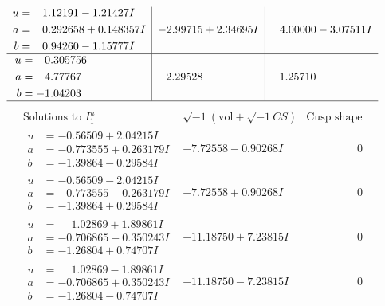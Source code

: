 \documentclass[1p]{elsarticle_modified}
\theoremstyle{definition}
\newcommand{\I}{\sqrt{-1}}
\begin{document}
$$\begin{array}{c|c|c}
\begin{aligned}
u &= \phantom{-}1.12191 - 1.21427 I \\
a &= \phantom{-}0.292658 + 0.148357 I \\
b &= \phantom{-}0.94260 - 1.15777 I\end{aligned}
 & -2.99715 + 2.34695 I & \phantom{-}4.00000 - 3.07511 I \\ \hline\begin{aligned}
u &= \phantom{-}0.305756\phantom{ +0.000000I} \\
a &= \phantom{-}4.77767\phantom{ +0.000000I} \\
b &= -1.04203\phantom{ +0.000000I}\end{aligned}
 & \phantom{-}2.29528\phantom{ +0.000000I} & \phantom{-}1.25710\phantom{ +0.000000I}\\
 \hline 
 \end{array}$$\newpage$$\begin{array}{c|c|c}  
\text{Solutions to }I^u_{1}& \I (\text{vol} + \sqrt{-1}CS) & \text{Cusp shape}\\
 \hline 
\begin{aligned}
u &= -0.56509 + 2.04215 I \\
a &= -0.773555 + 0.263179 I \\
b &= -1.39864 - 0.29584 I\end{aligned}
 & -7.72558 - 0.90268 I & \phantom{-0.000000 } 0 \\ \hline\begin{aligned}
u &= -0.56509 - 2.04215 I \\
a &= -0.773555 - 0.263179 I \\
b &= -1.39864 + 0.29584 I\end{aligned}
 & -7.72558 + 0.90268 I & \phantom{-0.000000 } 0 \\ \hline\begin{aligned}
u &= \phantom{-}1.02869 + 1.89861 I \\
a &= -0.706865 - 0.350243 I \\
b &= -1.26804 + 0.74707 I\end{aligned}
 & -11.18750 + 7.23815 I & \phantom{-0.000000 } 0 \\ \hline\begin{aligned}
u &= \phantom{-}1.02869 - 1.89861 I \\
a &= -0.706865 + 0.350243 I \\
b &= -1.26804 - 0.74707 I\end{aligned}
 & -11.18750 - 7.23815 I & \phantom{-0.000000 } 0 \\ \hline\begin{aligned}

\end{aligned}
\end{array}$$
\end{document}
